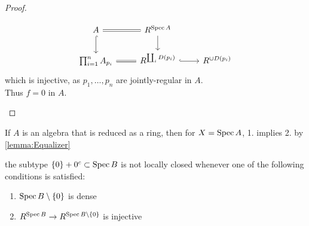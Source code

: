 \documentclass{article}
\begin{document}
\begin{proof}
\begin{enumerate}
	\[\begin{tikzcd}
		A & {R^{\Spec A}} \\
		{	{\prod_{i=1}^n A_{p_i}} } & {{R^{\coprod_i D(p_i)}}} & {R^{\cup D(p_i)}}
		\arrow[hook, from=1-1, to=2-1]
		\arrow[Rightarrow, no head, from=1-2, to=1-1]
		\arrow[from=1-2, to=2-2]
		\arrow[Rightarrow, no head, from=2-2, to=2-1]
		\arrow[hook, from=2-2, to=2-3]
	\end{tikzcd}\]
	which is injective, as $p_1,\hdots,p_n$ are jointly-regular in $A$. \\
	Thus $f = 0$ in $A$.
		\end{enumerate}
\end{proof}
\begin{rmk}
	If $A$ is an algebra that is reduced as a ring, then for $X = \operatorname{Spec} A$, 1. implies 2. by \ref{lemma:Equalizer}
\end{rmk}
\begin{prop}{\label{prop:NotLocClosed}}
the subtype $\{0\} + 0^c \subset \operatorname{Spec} B$ is not locally closed whenever one of the following conditions is satisfied:
	\begin{enumerate}
		\item 	$\operatorname{Spec} B \setminus \{0\}$ is dense 
		\item $R^{\operatorname{Spec} B} \to R^{\operatorname{Spec} B \setminus \{0\}}$ is injective
	\end{enumerate}
\end{prop}
\end{document}
